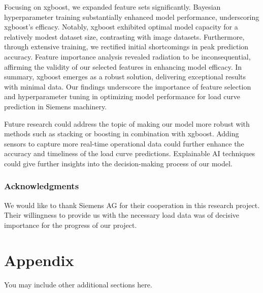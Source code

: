 \documentclass{article} %
\begin{document}
Focusing on \gls*{xgboost}, we expanded feature sets significantly. Bayesian hyperparameter training substantially enhanced model performance, underscoring \gls*{xgboost}'s efficacy. Notably, \gls*{xgboost} exhibited optimal model capacity for a relatively modest dataset size, contrasting with image datasets. Furthermore, through extensive training, we rectified initial shortcomings in peak prediction accuracy. Feature importance analysis revealed radiation to be inconsequential, affirming the validity of our selected features in enhancing model efficacy. In summary, \gls*{xgboost} emerges as a robust solution, delivering exceptional results with minimal data. Our findings underscore the importance of feature selection and hyperparameter tuning in optimizing model performance for load curve prediction in Siemens machinery. 

Future research could address the topic of making our model more robust with methods such as stacking or boosting in combination with \gls*{xgboost}. Adding sensors to capture more real-time operational data could further enhance the accuracy and timeliness of the load curve predictions. Explainable AI techniques could give further insights into the decision-making process of our model.

\subsubsection*{Acknowledgments}
We would like to thank Siemens AG for their cooperation in this research project. Their willingness to provide us with the necessary load data was of decisive importance for the progress of our project.





\appendix
\section{Appendix}
You may include other additional sections here.
\end{document}
